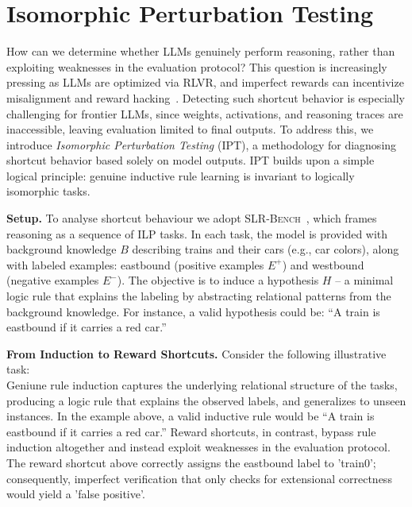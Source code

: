 \documentclass{article}
\newcommand{\benchmark}{\textsc{SLR-Bench}\xspace}
\begin{document}
\section{Isomorphic Perturbation Testing}\label{sec:setup}
How can we determine whether LLMs genuinely perform reasoning, rather than exploiting weaknesses in the evaluation protocol? This question is increasingly pressing as LLMs are optimized via RLVR, and imperfect rewards can incentivize misalignment and reward hacking~\citep{metr2025,zhong2025impossiblebench}. 
Detecting such shortcut behavior is especially challenging for frontier LLMs, since weights, activations, and reasoning traces are inaccessible, leaving evaluation limited to final outputs. To address this, we introduce \textit{Isomorphic Perturbation Testing} (IPT), a methodology for diagnosing shortcut behavior based solely on model outputs. IPT builds upon a simple logical principle: genuine inductive rule learning is invariant to logically isomorphic tasks.



\textbf{Setup.} To analyse shortcut behaviour we adopt \benchmark~\citep{helff2025slr}, which frames reasoning as a sequence of ILP tasks. In each task, the model is provided with background knowledge $B$ describing trains and their cars (e.g., car colors), along with labeled examples: eastbound (positive examples $E^+$) and westbound (negative examples $E^-$). The objective is to induce a hypothesis $H$ -- a minimal logic rule that explains the labeling by abstracting relational patterns from the background knowledge. For instance, a valid hypothesis could be: “A train is eastbound if it carries a red car.”

\textbf{From Induction to Reward Shortcuts.} Consider the following illustrative task:
\\
Geniune rule induction captures the underlying relational structure of the tasks, producing a logic rule that explains the observed labels, and generalizes to unseen instances. In the example above, a valid inductive rule would be “A train is eastbound if it carries a red car.”
Reward shortcuts, in contrast, bypass rule induction altogether and instead exploit weaknesses in the evaluation protocol. The reward shortcut above correctly assigns the eastbound label to 'train0'; consequently, imperfect verification that only checks for extensional correctness would yield a 'false positive'.
\end{document}
